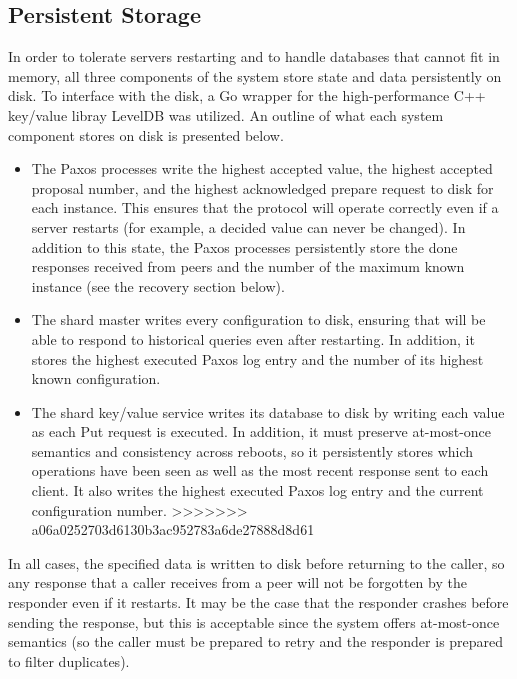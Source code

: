 \documentclass[letterpaper,10pt]{article}
\begin{document}
\begin{itemize}
\subsection{Persistent Storage}
In order to tolerate servers restarting and to handle databases that
cannot fit in memory, all three components of the system store state
and data persistently on disk.  To interface with the disk, a Go
wrapper for the high-performance C++ key/value libray LevelDB was
utilized.  An outline of what each system component stores on disk is
presented below.
\begin{itemize}
\item The Paxos processes write the highest accepted value, the
  highest accepted proposal number, and the highest acknowledged
  prepare request to disk for each instance.  This ensures that the
  protocol will operate correctly even if a server restarts (for
  example, a decided value can never be changed).  In addition to this
  state, the Paxos processes persistently store the done responses
  received from peers and the number of the maximum known instance
  (see the recovery section below).

\item The shard master writes every configuration to disk, ensuring
  that will be able to respond to historical queries even after
  restarting.  In addition, it stores the highest executed Paxos log
  entry and the number of its highest known configuration.

\item The shard key/value service writes its database to disk by
  writing each value as each Put request is executed.  In addition, it
  must preserve at-most-once semantics and consistency across reboots,
  so it persistently stores which operations have been seen as well as
  the most recent response sent to each client.  It also writes the
  highest executed Paxos log entry and the current configuration
  number.
>>>>>>> a06a0252703d6130b3ac952783a6de27888d8d61
\end{itemize}

In all cases, the specified data is written to disk before returning
to the caller, so any response that a caller receives from a peer will
not be forgotten by the responder even if it restarts.  It may be the
case that the responder crashes before sending the response, but this
is acceptable since the system offers at-most-once semantics (so the
caller must be prepared to retry and the responder is prepared to
filter duplicates).


\end{itemize}
\end{document}
